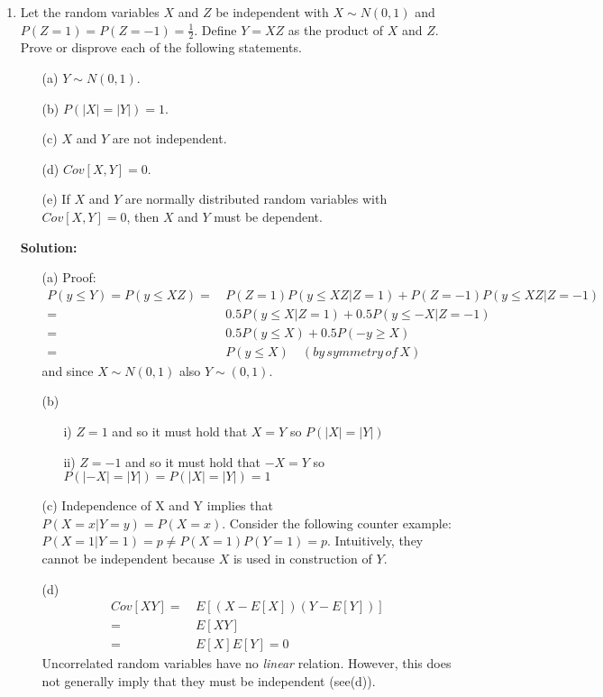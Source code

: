 \documentclass[letterpaper,12pt]{article}
\theoremstyle{definition}
\begin{document}
\begin{enumerate}
\begin{itemize}
\end{itemize}
	\item Let the random variables $X$ and $Z$ be independent with $X \sim N(0,1)$ and $P(Z=1)=P(Z=-1)=\frac{1}{2}$. 			Define $Y= XZ$ as the product of $X$ and $Z$. Prove or disprove each of the following statements.
		\begin{itemize}
			\item[(a)] $Y \sim N(0,1)$.
			\item[(b)] $P(|X|=|Y|)=1$.
			\item[(c)] $X$ and $Y$ are not independent.
			\item[(d)] $Cov[X,Y]=0$.
			\item[(e)] If $X$ and $Y$ are normally distributed random variables with $Cov[X,Y]=0$, then $X$ and $Y$ 					must be dependent.
		\end{itemize}
\textbf{Solution:}
\begin{itemize}
			\item[(a)]Proof:\begin{align*}
			P(y \leq Y) = P(y \leq XZ) =& \, P(Z=1)P(y \leq XZ| Z=1) + P(Z=-1)P(y \leq XZ| Z=-1) \\
			=& \, 0.5P(y\leq X|Z=1) + 0.5P(y\leq -X|Z=-1)  \\
			=& \, 0.5 P(y \leq X) + 0.5P(-y\geq X) \\
			=& \, P(y \leq X)  \quad (by \, symmetry\,  of\,  X)
			\end{align*}
			and since $X \sim N(0,1)$ also $Y \sim (0,1)$.
			\item[(b)] \begin{itemize}
			\item[i)] $Z=1$ and so it must hold that $X=Y$ so $P(|X|=|Y|)$
			\item[ii)] $Z=-1$ and so it must hold that $-X=Y$ so $P(|-X|=|Y|) = P(|X|=|Y|)= 1$
			\end{itemize}
			\item[(c)] Independence of X and Y implies that $P(X=x|Y=y) = P(X=x)$. Consider the following counter example:
$P(X=1|Y=1) = p \neq P(X=1)P(Y=1) = p$. Intuitively, they cannot be  independent because $X$ is used in construction of $Y$.
			\item[(d)] \begin{align*}
			Cov[XY]=& \, E\left[ (X-E[X])(Y-E[Y]) \right] \\
			=& \, E[XY]  \\
			=& \, E[X]E[Y] = 0
			\end{align*}
			Uncorrelated random variables have no \textit{linear} relation. However, this does not generally imply that they must be independent (see(d)).

\end{itemize}
\end{enumerate}
\end{document}
